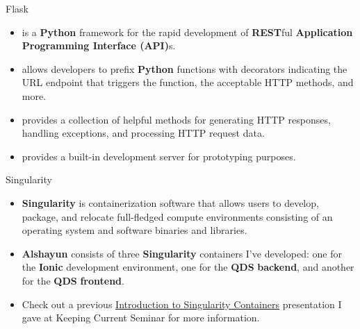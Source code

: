 \documentclass{beamer}
\begin{document}
\begin{frame}{Flask}
    \begin{itemize}[font=$\bullet$\scshape\bfseries]
        \item is a \textbf{Python} framework for the rapid development of
            \textbf{REST}ful \textbf{Application Programming Interface (API)}s.
        \item allows developers to prefix \textbf{Python} functions with
            decorators indicating the URL endpoint that triggers the function,
            the acceptable HTTP methods, and more.
        \item provides a collection of helpful methods for generating HTTP
            responses, handling exceptions, and processing HTTP request data.
        \item provides a built-in development server for prototyping purposes.
    \end{itemize}
\end{frame}

\begin{frame}{Singularity}
    \begin{itemize}
        \item \textbf{Singularity} is containerization software that allows
            users to develop, package, and relocate full-fledged compute
            environments consisting of an operating system and software binaries
            and libraries.
        \item \textbf{Alshayun} consists of three \textbf{Singularity}
            containers I've developed: one for the \textbf{Ionic} development
            environment, one for the \textbf{QDS} \textbf{backend}, and another
            for the \textbf{QDS} \textbf{frontend}.
        \item Check out a previous
            \href{https://youtu.be/NeTRm7_JwX8}{Introduction to Singularity
            Containers} presentation I gave at Keeping Current Seminar for more
            information.
    \end{itemize}
\end{frame}
\end{document}
